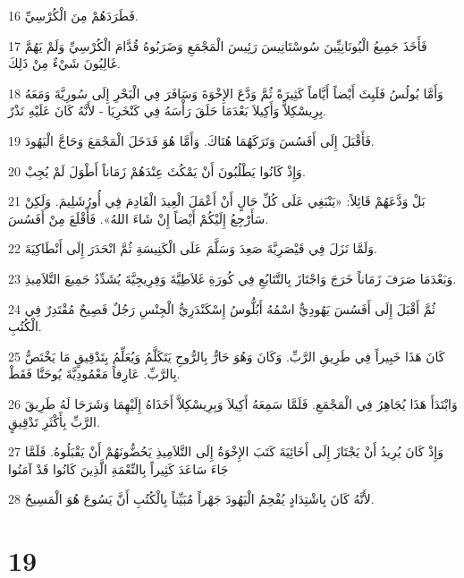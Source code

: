 \par 16 فَطَرَدَهُمْ مِنَ الْكُرْسِيِّ.
\par 17 فَأَخَذَ جَمِيعُ الْيُونَانِيِّينَ سُوسْتَانِيسَ رَئِيسَ الْمَجْمَعِ وَضَرَبُوهُ قُدَّامَ الْكُرْسِيِّ وَلَمْ يَهُمَّ غَالِيُونَ شَيْءٌ مِنْ ذَلِكَ.
\par 18 وَأَمَّا بُولُسُ فَلَبِثَ أَيْضاً أَيَّاماً كَثِيرَةً ثُمَّ وَدَّعَ الإِخْوَةَ وَسَافَرَ فِي الْبَحْرِ إِلَى سُورِيَّةَ وَمَعَهُ بِرِيسْكِلاَّ وَأَكِيلاَ بَعْدَمَا حَلَقَ رَأْسَهُ فِي كَنْخَرِيَا - لأَنَّهُ كَانَ عَلَيْهِ نَذْرٌ.
\par 19 فَأَقْبَلَ إِلَى أَفَسُسَ وَتَرَكَهُمَا هُنَاكَ. وَأَمَّا هُوَ فَدَخَلَ الْمَجْمَعَ وَحَاجَّ الْيَهُودَ.
\par 20 وَإِذْ كَانُوا يَطْلُبُونَ أَنْ يَمْكُثَ عِنْدَهُمْ زَمَاناً أَطْوَلَ لَمْ يُجِبْ.
\par 21 بَلْ وَدَّعَهُمْ قَائِلاً: «يَنْبَغِي عَلَى كُلِّ حَالٍ أَنْ أَعْمَلَ الْعِيدَ الْقَادِمَ فِي أُورُشَلِيمَ. وَلَكِنْ سَأَرْجِعُ إِلَيْكُمْ أَيْضاً إِنْ شَاءَ اللهُ». فَأَقْلَعَ مِنْ أَفَسُسَ.
\par 22 وَلَمَّا نَزَلَ فِي قَيْصَرِيَّةَ صَعِدَ وَسَلَّمَ عَلَى الْكَنِيسَةِ ثُمَّ انْحَدَرَ إِلَى أَنْطَاكِيَةَ.
\par 23 وَبَعْدَمَا صَرَفَ زَمَاناً خَرَجَ وَاجْتَازَ بِالتَّتَابُعِ فِي كُورَةِ غَلاَطِيَّةَ وَفِرِيجِيَّةَ يُشَدِّدُ جَمِيعَ التَّلاَمِيذِ.
\par 24 ثُمَّ أَقْبَلَ إِلَى أَفَسُسَ يَهُودِيٌّ اسْمُهُ أَبُلُّوسُ إِسْكَنْدَرِيُّ الْجِنْسِ رَجُلٌ فَصِيحٌ مُقْتَدِرٌ فِي الْكُتُبِ.
\par 25 كَانَ هَذَا خَبِيراً فِي طَرِيقِ الرَّبِّ. وَكَانَ وَهُوَ حَارٌّ بِالرُّوحِ يَتَكَلَّمُ وَيُعَلِّمُ بِتَدْقِيقٍ مَا يَخْتَصُّ بِالرَّبِّ. عَارِفاً مَعْمُودِيَّةَ يُوحَنَّا فَقَطْ.
\par 26 وَابْتَدَأَ هَذَا يُجَاهِرُ فِي الْمَجْمَعِ. فَلَمَّا سَمِعَهُ أَكِيلاَ وَبِرِيسْكِلاَّ أَخَذَاهُ إِلَيْهِمَا وَشَرَحَا لَهُ طَرِيقَ الرَّبِّ بِأَكْثَرِ تَدْقِيقٍ.
\par 27 وَإِذْ كَانَ يُرِيدُ أَنْ يَجْتَازَ إِلَى أَخَائِيَةَ كَتَبَ الإِخْوَةُ إِلَى التَّلاَمِيذِ يَحُضُّونَهُمْ أَنْ يَقْبَلُوهُ. فَلَمَّا جَاءَ سَاعَدَ كَثِيراً بِالنِّعْمَةِ الَّذِينَ كَانُوا قَدْ آمَنُوا
\par 28 لأَنَّهُ كَانَ بِاشْتِدَادٍ يُفْحِمُ الْيَهُودَ جَهْراً مُبَيِّناً بِالْكُتُبِ أَنَّ يَسُوعَ هُوَ الْمَسِيحُ.

\chapter{19}

